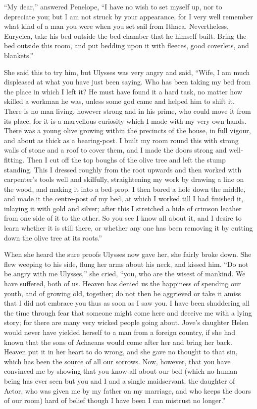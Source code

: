 “My dear,” answered Penelope, “I have no wish to set myself up, nor to
depreciate you; but I am not struck by your appearance, for I very well
remember what kind of a man you were when you set sail from Ithaca.
Nevertheless, Euryclea, take his bed outside the bed chamber that he himself
built. Bring the bed outside this room, and put bedding upon it with fleeces,
good coverlets, and blankets.”

She said this to try him, but Ulysses was very angry and said, “Wife, I am much
displeased at what you have just been saying. Who has been taking my bed from
the place in which I left it? He must have found it a hard task, no matter how
skilled a workman he was, unless some god came and helped him to shift it.
There is no man living, however strong and in his prime, who could move it from
its place, for it is a marvellous curiosity which I made with my very own
hands. There was a young olive growing within the precincts of the house, in
full vigour, and about as thick as a bearing-post. I built my room round this
with strong walls of stone and a roof to cover them, and I made the doors
strong and well-fitting. Then I cut off the top boughs of the olive tree and
left the stump standing. This I dressed roughly from the root upwards and then
worked with carpenter’s tools well and skilfully, straightening my work by
drawing a line on the wood, and making it into a bed-prop. I then bored a hole
down the middle, and made it the centre-post of my bed, at which I worked till
I had finished it, inlaying it with gold and silver; after this I stretched a
hide of crimson leather from one side of it to the other. So you see I know all
about it, and I desire to learn whether it is still there, or whether any one
has been removing it by cutting down the olive tree at its roots.”

When she heard the sure proofs Ulysses now gave her, she fairly broke down. She
flew weeping to his side, flung her arms about his neck, and kissed him. “Do
not be angry with me Ulysses,” she cried, “you, who are the wisest of mankind.
We have suffered, both of us. Heaven has denied us the happiness of spending
our youth, and of growing old, together; do not then be aggrieved or take it
amiss that I did not embrace you thus as soon as I saw you. I have been
shuddering all the time through fear that someone might come here and deceive
me with a lying story; for there are many very wicked people going about.
Jove’s daughter Helen would never have yielded herself to a man from a foreign
country, if she had known that the sons of Achaeans would come after her and
bring her back. Heaven put it in her heart to do wrong, and she gave no thought
to that sin, which has been the source of all our sorrows. Now, however, that
you have convinced me by showing that you know all about our bed (which no
human being has ever seen but you and I and a single maidservant, the daughter
of Actor, who was given me by my father on my marriage, and who keeps the doors
of our room) hard of belief though I have been I can mistrust no longer.”

